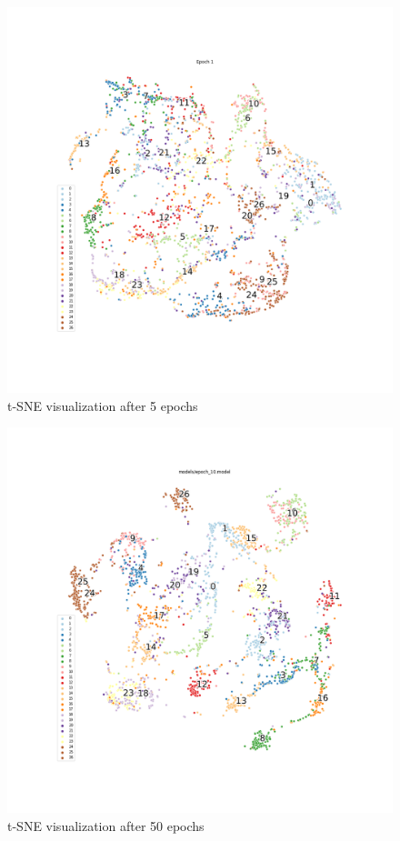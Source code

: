 \documentclass[10pt]{article}
\begin{document}
\begin{figure}
\includegraphics[scale=.45]{tsne/epoch_1.png}
\caption{t-SNE visualization after 5 epochs}
\end{figure}

\begin{figure}
\includegraphics[scale=.45]{tsne/epoch_10.png}
\caption{t-SNE visualization after 50 epochs}
\end{figure}
\end{document}
